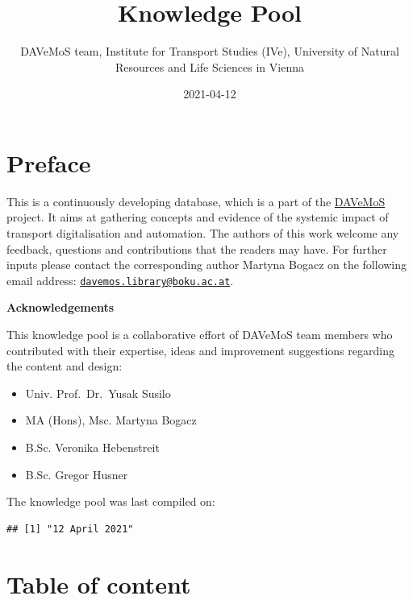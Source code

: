 \documentclass[
]{book}
\title{Knowledge Pool}
\author{DAVeMoS team, Institute for Transport Studies (IVe), University of Natural Resources and Life Sciences in Vienna}
\date{2021-04-12}
\providecommand{\tightlist}{%
  \setlength{\itemsep}{0pt}\setlength{\parskip}{0pt}}
\begin{document}
\maketitle

{
\setcounter{tocdepth}{1}
\tableofcontents
}
\hypertarget{preface}{%
\chapter*{Preface}\label{preface}}

This is a continuously developing database, which is a part of the \href{https://www.davemos.online/}{DAVeMoS} project. It aims at gathering concepts and evidence of the systemic impact of transport digitalisation and automation. The authors of this work welcome any feedback, questions and contributions that the readers may have. For further inputs please contact the corresponding author Martyna Bogacz on the following email address: \href{mailto:davemos.library@boku.ac.at}{\nolinkurl{davemos.library@boku.ac.at}}.

\textbf{Acknowledgements}

This knowledge pool is a collaborative effort of DAVeMoS team members who contributed with their expertise, ideas and improvement suggestions regarding the content and design:

\begin{itemize}
\tightlist
\item
  Univ. Prof.~Dr.~Yusak Susilo
\item
  MA (Hons), Msc. Martyna Bogacz
\item
  B.Sc. Veronika Hebenstreit
\item
  B.Sc. Gregor Husner
\end{itemize}

The knowledge pool was last compiled on:

\begin{verbatim}
## [1] "12 April 2021"
\end{verbatim}

\hypertarget{table-of-content}{%
\chapter*{Table of content}\label{table-of-content}}
\end{document}
